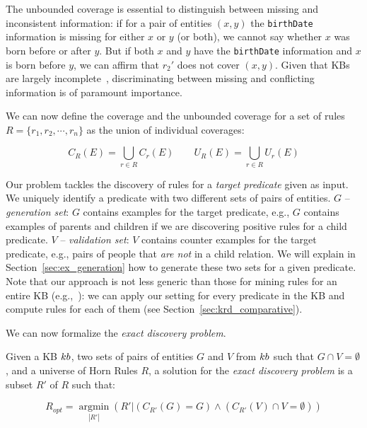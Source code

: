 \vspace{0.5ex}
The unbounded coverage is essential to distinguish between missing and inconsistent information: if for a pair of entities $(x,y)$ the \texttt{birthDate} information is missing for either $x$ or $y$ (or both), we cannot say whether $x$ was born before or after $y$. 
But if both $x$ and $y$ have the \texttt{birthDate} information and $x$ is born before $y$, we can affirm that $r_2'$ does not cover $(x,y)$. Given that KBs are largely incomplete~\cite{min2013distant}, discriminating between missing and conflicting information is of paramount importance.

We can now define the coverage and the unbounded coverage for a set of rules $R=\{r_1,r_2,\cdots,r_n\}$ as the union of individual coverages:


\vspace{-4mm}	
\begin{equation*}
	C_R(E) = \bigcup \limits_{r \in R} C_r(E) \qquad U_R(E) = \bigcup \limits_{r \in R} U_r(E) 	\end{equation*}
\vspace{-2mm}

Our problem tackles the discovery of %
rules for a {\em target predicate} given as input. We uniquely identify a predicate with two different sets of pairs of entities.
$G$ -- \emph{generation set}: $G$ contains examples for the target predicate, e.g., $G$ contains examples of parents and children if we are discovering positive rules for a child predicate.
$V$ -- \emph{validation set}: $V$ contains counter examples for the target predicate, e.g., pairs of people that {\em are not} in a child relation.
We will explain in Section~\ref{sec:ex_generation} how to generate these two sets for a given predicate. Note that our approach is not less generic than those for mining rules for an entire KB (e.g.,~\cite{abedjan2014amending,galarraga2015fast}): 
we can apply our setting for every predicate in the KB and compute rules for each of them (see Section~\ref{sec:krd_comparative}).

We can now formalize the \emph{exact discovery problem}.
\begin{definition}
	Given a KB ${\sc kb}$, two sets of pairs of entities $G$ and $V$ from ${\sc kb}$ such that $G \cap V = \emptyset$, and a universe of Horn Rules $R$, a solution for the \emph{exact discovery problem} is a subset $R'$ of $R$  such that:
	
	\vspace{-4mm}	
	\begin{equation*}
		R_{opt}=\underset{|R'|}{\operatorname{argmin}}(R'|(C_{R'}(G) = G) \wedge (C_{R'}(V) \cap V = \emptyset) )	\end{equation*}
	
\end{definition}

